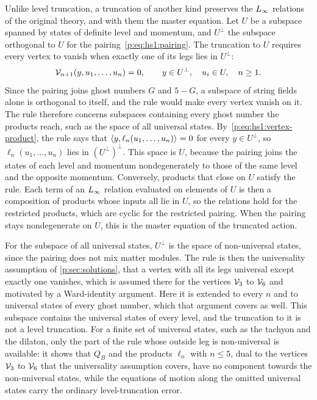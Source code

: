 Unlike level truncation, a truncation of another kind preserves the $L_\infty$ relations of the original theory, and with them the master equation.
Let $U$ be a subspace spanned by states of definite level and momentum, and $U^\perp$ the subspace orthogonal to $U$ for the pairing~\eqref{p:eq:hs1:pairing}.
The truncation to $U$ requires every vertex to vanish when exactly one of its legs lies in $U^\perp$:
\begin{equation}
  \label{p:eq:gauge:closed-subspace-rule}
  \mathcal{V}_{n + 1}(y, u_1, \ldots, u_n)
    = 0,
  \qquad
  y \in U^\perp,
  \quad
  u_i \in U,
  \quad
  n \ge 1.
\end{equation}
Since the pairing joins ghost numbers $G$ and $5 - G$, a subspace of string fields alone is orthogonal to itself, and the rule would make every vertex vanish on it.
The rule therefore concerns subspaces containing every ghost number the products reach, such as the space of all universal states.
By~\eqref{p:eq:hs1:vertex-product}, the rule says that $\braket{y, \ell_n(u_1, \ldots, u_n)}_{} = 0$ for every $y \in U^\perp$, so $\ell_n(u_1, \ldots, u_n)$ lies in $(U^\perp)^\perp$.
This space is $U$, because the pairing joins the states of each level and momentum nondegenerately to those of the same level and the opposite momentum.
Conversely, products that close on $U$ satisfy the rule.
Each term of an $L_\infty$ relation evaluated on elements of $U$ is then a composition of products whose inputs all lie in $U$, so the relations hold for the restricted products, which are cyclic for the restricted pairing.
When the pairing stays nondegenerate on $U$, this is the master equation of the truncated action.

For the subspace of all universal states, $U^\perp$ is the space of non-universal states, since the pairing does not mix matter modules.
The rule is then the universality assumption of \cref{p:sec:solutions}, that a vertex with all its legs universal except exactly one vanishes, which is assumed there for the vertices $\mathcal{V}_{3}$ to $\mathcal{V}_{6}$ and motivated by a Ward-identity argument.
  Here it is extended to every $n$ and to universal states of every ghost number, which that argument covers as well.
This subspace contains the universal states of every level, and the truncation to it is not a level truncation.
For a finite set of universal states, such as the tachyon and the dilaton, only the part of the rule whose outside leg is non-universal is available: it shows that $Q_B$ and the products $\ell_n$ with $n \le 5$, dual to the vertices $\mathcal{V}_{3}$ to $\mathcal{V}_{6}$ that the universality assumption covers, have no component towards the non-universal states, while the equations of motion along the omitted universal states carry the ordinary level-truncation error.

